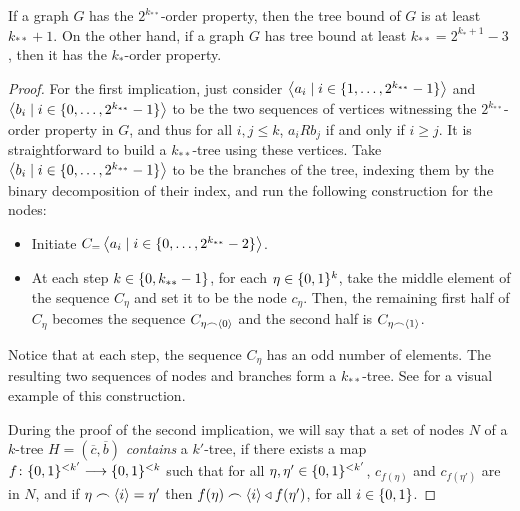     \begin{theorem} \label{thm:tree_implies_order}
        If a graph $G$ has the $2^{k_{**}}$-order property, then the tree bound of $G$ is at least $k_{**} + 1$.
        On the other hand, if a graph $G$ has tree bound at least $k_{**} = 2^{k_*+1}-3$, then it has the $k_*$-order
        property.
        \begin{proof}
            For the first implication, just consider $\left< a_i \mid i \in \{ 1, \dots, 2^{k_{**}}-1 \} \right>$ and
            $\left< b_i \mid i \in \{ 0, \dots, 2^{k_{**}}-1 \} \right>$ to be the two sequences of vertices witnessing the
            $2^{k_{**}}$-order property in $G$, and thus for all $i,j \leq k$, $a_i R b_j$ if and only if $i \geq j$.
            It is straightforward to build a $k_{**}$-tree using these vertices.
            Take $\left< b_i \mid i \in \{ 0, \dots, 2^{k_{**}}-1 \} \right>$ to be the branches of the tree, indexing them by
            the binary decomposition of their index, and run the following construction for the nodes:
            \begin{itemize}
                \item Initiate $C_\empty = \Partriangle{a_i \mid i \in \parcurly{0, \dots, 2^{k_{**}}-2}}$.
                \item At each step $k \in \{ 0, k_{**}-1 \}$, for each $\eta \in \{ 0,1 \}^k$, take the middle
                    element of the sequence $C_\eta$ and set it to be the node $c_\eta$.
                    Then, the remaining first half of $C_\eta$ becomes the sequence $C_{\eta \frown \left< 0 \right>}$
                    and the second half is $C_{\eta \frown \left< 1 \right>}$.
            \end{itemize}
            Notice that at each step, the sequence $C_\eta$ has an odd number of elements.
            The resulting two sequences of nodes and branches form a $k_{**}$-tree.
            See  for a visual example of this construction.

            During the proof of the second implication, we will say that a set of nodes $N$ of a $k$-tree
            $H = (\overline{c},\overline{b})$ \emph{contains} a $k'$-tree, if there exists a map
            $f \colon \{ 0,1 \}^{<k'} \longrightarrow \{ 0,1 \}^{<k}$ such that for all $\eta, \eta' \in \{ 0,1 \}^{<k'}$,
            $c_{f(\eta)}$ and $c_{f(\eta')}$ are in $N$, and if $\eta \frown \left< i \right> = \eta'$ then
            $f(\eta) \frown \left< i \right> \triangleleft f(\eta')$, for all $i \in \{ 0, 1 \}$.


\end{proof}
\end{theorem}
